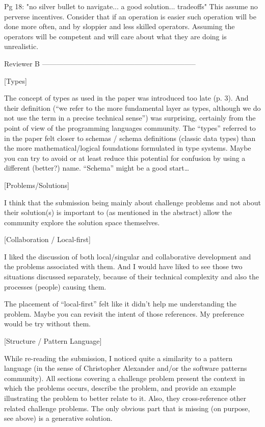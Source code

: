 Pg 18: "no silver bullet to navigate... a good solution... tradeoffs" This assume no perverse incentives. Consider that if an operation is easier such operation will be done more often, and by sloppier and less skilled operators. Assuming the operators will be competent and will care about what they are doing is unrealistic.


Reviewer B
-----------------------------------------------------------------

[Types]

The concept of types as used in the paper was introduced too late (p. 3). And their definition (“we refer to the more fundamental layer as types, although we do not use the term in a precise technical sense”) was surprising, certainly from the point of view of the programming languages community. The “types” referred to in the paper felt closer to schemas / schema definitions (classic data types) than the more mathematical/logical foundations formulated in type systems. Maybe you can try to avoid or at least reduce this potential for confusion by using a different (better?) name. “Schema” might be a good start…

[Problems/Solutions]

I think that the submission being mainly about challenge problems and not about their solution(s) is important to (as mentioned in the abstract) allow the community explore the solution space themselves.

[Collaboration / Local-first]

I liked the discussion of both local/singular and collaborative development and the problems associated with them. And I would have liked to see those two situations discussed separately, because of their technical complexity and also the processes (people) causing them.

The placement of “local-first” felt like it didn’t help me understanding the problem. Maybe you can revisit the intent of those references. My preference would be try without them.

[Structure / Pattern Language]

While re-reading the submission, I noticed quite a similarity to a pattern language (in the sense of Christopher Alexander and/or the software patterns community). All sections covering a challenge problem present the context in which the problems occurs, describe the problem, and provide an example illustrating the problem to better relate to it. Also, they cross-reference other related challenge problems. The only obvious part that is missing (on purpose, see above) is a generative solution.

